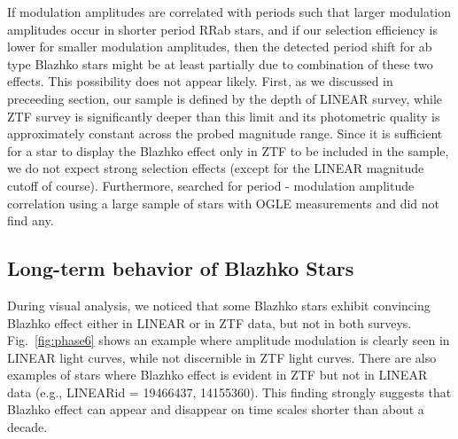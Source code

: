 If modulation amplitudes are correlated with periods such that larger
modulation amplitudes occur in shorter period RRab stars, and if
our selection efficiency is lower for smaller modulation amplitudes,
then the detected period shift for ab type Blazhko stars might be at
least partially due to combination of these two effects. This
possibility does not appear likely. First, as we discussed in
preceeding section, our sample is defined by the depth of LINEAR survey, 
while ZTF survey is significantly deeper than this limit and its photometric quality is approximately constant across the probed 
magnitude range. Since it is sufficient for a star to display the
Blazhko effect only in ZTF to be included in the sample, 
we do not expect strong selection effects (except for the LINEAR
magnitude cutoff of course).  Furthermore, \cite{2020MNRAS.494.1237S}
searched for period - modulation amplitude correlation using a large
sample of stars with OGLE measurements and did not find any. 
 

\subsection{Long-term behavior of Blazhko Stars}

During visual analysis, we noticed that some Blazhko stars exhibit
convincing Blazhko effect either in LINEAR or in ZTF data, but not in
both surveys. Fig.~\ref{fig:phase6} shows an example where amplitude
modulation is clearly seen in LINEAR light curves, while not discernible
in ZTF light curves.  There are also examples of stars where Blazhko effect is evident in
ZTF but not in LINEAR data (e.g., LINEARid = 19466437, 14155360). 
This finding  strongly suggests that Blazhko effect can appear and disappear on time scales shorter than
about a decade.

 
